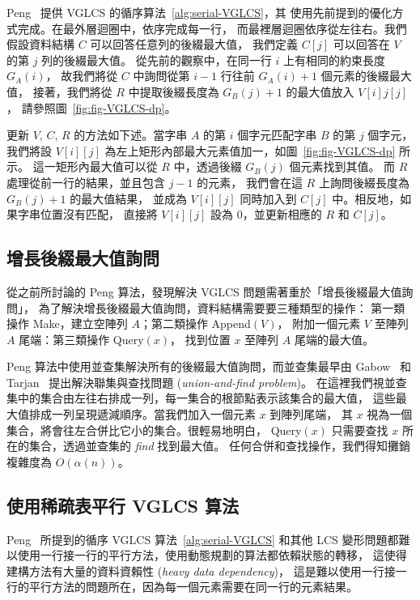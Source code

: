 Peng~\cite{Peng2011TheLC} 提供 VGLCS 的循序算法~\ref{alg:serial-VGLCS}，其
使用先前提到的優化方式完成。在最外層迴圈中，依序完成每一行，
而最裡層迴圈依序從左往右。我們假設資料結構 $C$ 可以回答任意列的後綴最大值，
我們定義 $C[j]$ 可以回答在 $V$ 的第 $j$ 列的後綴最大值。
從先前的觀察中，在同一行 $i$ 上有相同的約束長度 $G_A(i)$，
故我們將從 $C$ 中詢問從第 $i-1$ 行往前 $G_A(i)+1$ 個元素的後綴最大值，
接著，我們將從 $R$ 中提取後綴長度為 $G_B(j)+1$ 的最大值放入 $V[i]j[j]$，
請參照圖~\ref{fig:fig-VGLCS-dp}。

更新 $V$, $C$, $R$ 的方法如下述。當字串 $A$ 的第 $i$ 個字元匹配字串 $B$ 的第 $j$ 個字元，
我們將設 $V[i][j]$ 為左上矩形內部最大元素值加一，如圖~\ref{fig:fig-VGLCS-dp} 所示。
這一矩形內最大值可以從 $R$ 中，透過後綴 $G_B(j)$ 個元素找到其值。
而 $R$ 處理從前一行的結果，並且包含 $j-1$ 的元素，
我們會在這 $R$ 上詢問後綴長度為 $G_B(j)+1$ 的最大值結果，
並成為 $V[i][j]$ 同時加入到 $C[j]$ 中。相反地，如果字串位置沒有匹配，
直接將 $V[i][j]$ 設為 0，並更新相應的 $R$ 和 $C[j]$。
 


\subsection{增長後綴最大值詢問}

從之前所討論的 Peng 算法，發現解決 VGLCS 問題需著重於「增長後綴最大值詢問」，
為了解決增長後綴最大值詢問，資料結構需要要三種類型的操作：
第一類操作 {\sc Make}，建立空陣列 $A$；第二類操作 {\sc Append}$(V)$，
附加一個元素 $V$ 至陣列 $A$ 尾端：第三類操作 {\sc Query}$(x)$，
找到位置 $x$ 至陣列 $A$ 尾端的最大值。

Peng 算法中使用並查集解決所有的後綴最大值詢問，而並查集最早由 
Gabow~\cite{Gabow1983ALA} 和 Tarjan~\cite{Tarjan1975EfficiencyOA} 
提出解決聯集與查找問題 ({\em union-and-find problem})。
在這裡我們視並查集中的集合由左往右排成一列，每一集合的根節點表示該集合的最大值，
這些最大值排成一列呈現遞減順序。當我們加入一個元素 $x$ 到陣列尾端，
其 $x$ 視為一個集合，將會往左合併比它小的集合。很輕易地明白，
{\sc Query}$(x)$ 只需要查找 $x$ 所在的集合，透過並查集的 {\em find} 找到最大值。
任何合併和查找操作，我們得知攤銷複雜度為 $O(\alpha(n))$。

\subsection{使用稀疏表平行 VGLCS 算法}

Peng~\cite{Peng2011TheLC} 所提到的循序 VGLCS 算法~\ref{alg:serial-VGLCS} 
和其他 LCS 變形問題都難以使用一行接一行的平行方法，使用動態規劃的算法都依賴狀態的轉移，
這使得建構方法有大量的資料資賴性 ({\em heavy data dependency})，
這是難以使用一行接一行的平行方法的問題所在，因為每一個元素需要在同一行的元素結果。


